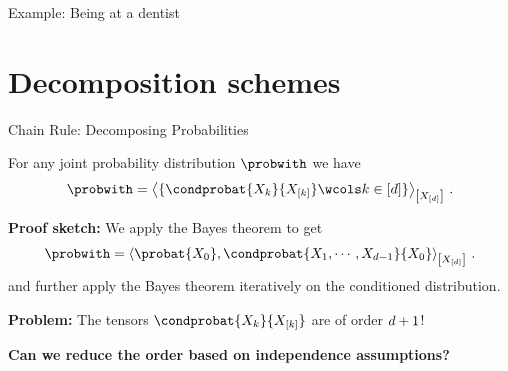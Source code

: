 \documentclass{beamer}
\begin{document}
\begin{frame}{Example: Being at a dentist}
{{                
            }
        }

    \end{frame}


    \section{Decomposition schemes}

    \begin{frame}{Chain Rule: Decomposing Probabilities}

        \begin{theorem}\label{the:chainRule}
            For any joint probability distribution $\probwith$ we have
            \begin{align*}
                \probwith
                = \contractionof{\{
                    \condprobat{\catvariableof{\catenumerator}}{\catvariableof{[\catenumerator]}} \wcols \catenumeratorin
                    \}
                }{\shortcatvariables} \, .
            \end{align*}
        \end{theorem}
            {\bf Proof sketch:} We apply the Bayes theorem to get
        \begin{align*}
            \probwith
            =\contractionof{\probat{\catvariableof{0}},\condprobat{\catvariableof{1},\cdots,\catvariableof{\catorder-1}}{\catvariableof{0}}}{\shortcatvariables} \, .
        \end{align*}
        and further apply the Bayes theorem iteratively on the conditioned distribution.
        \par
        {\bf Problem:}
        The tensors $\condprobat{\catvariableof{\catenumerator}}{\catvariableof{[\catenumerator]}}$ are of order $d+1$!
        \begin{center}
            \bf Can we reduce the order based on independence assumptions?
        \end{center}

    \end{frame}
\end{document}
